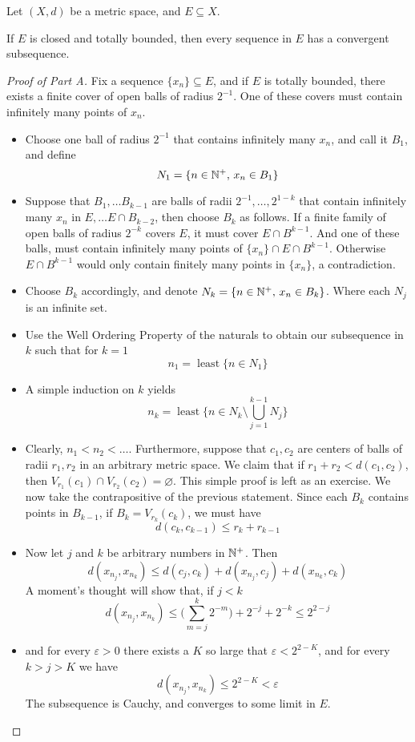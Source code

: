 \documentclass[../../main.tex]{subfiles}
\begin{document}
Let $(X,d)$ be a metric space, and $E\subseteq X$.
\begin{wts}
    If $E$ is closed and totally bounded, then every sequence in $E$ has a convergent subsequence.
\end{wts}
\begin{proof}[Proof of Part A]
    Fix a sequence $\{x_n\}\subseteq E$, and if $E$ is totally bounded, there exists a finite cover of open balls of radius $2^{-1}$. One of these covers must contain infinitely many points of $x_n$. 
    \begin{itemize}
        \item Choose one ball of radius $2^{-1}$ that contains infinitely many $x_n$, and call it $B_1$, and define
        \[
        N_1 = \{n\in\mathbb{N}^+,\, x_n\in B_1\}
        \]
        \item Suppose that $B_1,\ldots B_{k-1}$ are balls of radii $2^{-1},\ldots,2^{1-k}$ that contain infinitely many $x_n$ in $E,\ldots E\cap B_{k-2}$, then choose $B_k$ as follows. If a finite family of open balls of radius $2^{-k}$ covers $E$, it must cover $E\cap B^{k-1}$. And one of these balls, must contain infinitely many points of $\{x_n\}\cap E\cap B^{k-1}$. Otherwise $E\cap B^{k-1}$ would only contain finitely many points in $\{x_n\}$, a contradiction.
        \item Choose $B_k$ accordingly, and denote $N_k = \{n\in\mathbb{N}^+,\, x_n\in B_k\}$. Where each $N_j$ is an infinite set.
        \item Use the Well Ordering Property of the naturals to obtain our subsequence in $k$ such that for $k=1$
        \[
        n_1 = \operatorname{least}\biggl\{n\in N_1\biggr\}
        \]
        \item A simple induction on $k$ yields
        \[
        n_k = \operatorname{least}\biggl\{n\in N_k\setminus \bigcup^{k-1}_{j=1}N_j\biggr\}
        \]
        \item Clearly, $n_1<n_2<\ldots$. Furthermore, suppose that $c_1, c_2$ are centers of balls of radii $r_1, r_2$ in an arbitrary metric space. We claim that if $r_1 + r_2< d(c_1,c_2)$, then $V_{r_1}(c_1)\cap V_{r_2}(c_2)=\varnothing$. This simple proof is left as an exercise. We now take the contrapositive of the previous statement. Since each $B_k$ contains points in $B_{k-1}$, if $B_k = V_{r_k}(c_k)$, we must have
        \[
        d(c_k,c_{k-1})\leq r_k + r_{k-1}
        \]
        \item Now let $j$ and $k$ be arbitrary numbers in $\mathbb{N}^+$. Then
        \[
        d(x_{n_j},x_{n_k})\leq d(c_{j},c_{k}) + d(x_{n_j}, c_j) + d(x_{n_k}, c_k)
        \]
        A moment's thought will show that, if $j<k$
        \[
        d(x_{n_j},x_{n_k})\leq \biggl(\sum_{m=j}^k2^{-m}\biggr) + 2^{-j} + 2^{-k}\leq 2^{2-j}
        \]
        \item and for every $\varepsilon>0$ there exists a $K$ so large that $\varepsilon<2^{2-K}$, and for every $k>j>K$ we have
        \[
        d(x_{n_j}, x_{n_k})\leq 2^{2-K}<\varepsilon
        \]
        The subsequence is Cauchy, and converges to some limit in $E$.
    \end{itemize}
\end{proof}
\end{document}
